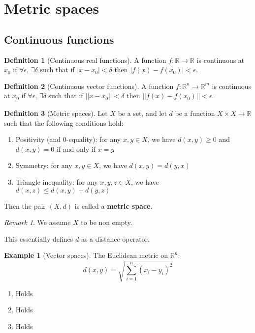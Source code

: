 \documentclass{article}
\theoremstyle{definition}
\newtheorem{defn}{Definition}[section]
\newtheorem{exmp}{Example}[section]
\theoremstyle{plain}%
\theoremstyle{remark}
\newtheorem*{rem}{Remark}
\begin{document}
\section{Metric spaces}

\subsection{Continuous functions}

\begin{defn}[Continuous real functions]
A function $f: \mathbb{R} \to \mathbb{R}$ is continuous at $x_0$ if $\forall \epsilon$, $\exists \delta$ such that if $|x - x_0| < \delta$ then $|f(x) - f(x_0)| < \epsilon$.
\end{defn}

\begin{defn}[Continuous vector functions]
A function $f: \mathbb{R}^n \to \mathbb{R}^m$ is continuous at $\underline{x_0}$ if $\forall \epsilon$, $\exists \delta$ such that if $||x - x_0|| < \delta$ then $||f(x) - f(x_0)|| < \epsilon$.
\end{defn}

\begin{defn}[Metric spaces]
Let $X$ be a set, and let $d$ be a function $X \times X \to \mathbb{R}$ such that the following conditions hold:
\begin{enumerate}
    \item Positivity (and 0-equality): for any $x, y \in X$, we have $d(x,y) \ge 0$ and $d(x,y) = 0$ if and only if $x=y$ 
    \item Symmetry: for any $x,y \in X$, we have $d(x,y) = d(y,x)$
    \item Triangle inequality: for any $x,y,z \in X$, we have $d(x,z) \le d(x,y) + d(y,z)$
\end{enumerate}

\begin{flushleft}
Then the pair $(X,d)$ is called a \textbf{metric space}.
\end{flushleft}
\end{defn}

\begin{rem}
We assume $X$ to be non empty.
\end{rem}

\begin{flushleft}
This essentially defines $d$ as a distance operator.
\end{flushleft}

\begin{exmp}[Vector spaces]
The Euclidean metric on $\mathbb{R}^n$:
\[d(x,y) = \sqrt{\sum_{i=1}^n (x_i - y_i)^2}\]

\begin{enumerate}
    \item Holds \checkmark
    \item Holds \checkmark
    \item Holds \checkmark
\end{enumerate}

\end{exmp}
\end{document}
